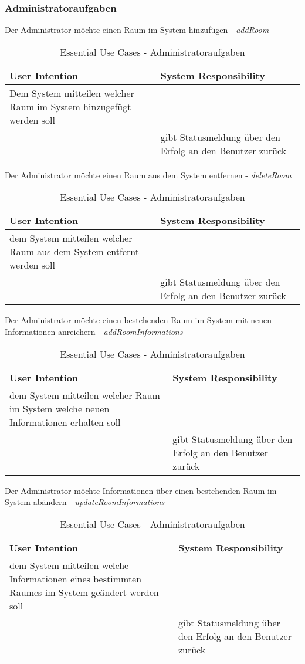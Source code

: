 \subsubsection{Administratoraufgaben}
\begin{table}[h]
	\caption{Essential Use Cases - Administratoraufgaben}
	Der Administrator möchte einen Raum im System hinzufügen - \textit{addRoom}\\
	\begin{tabularx}{\textwidth}{|X|X|}
	\rowcolor{heading} \textbf{User Intention} & \textbf{System Responsibility}\\ \hline
	Dem System mitteilen welcher Raum im System hinzugefügt werden soll & \\
	 & gibt Statusmeldung über den Erfolg an den Benutzer zurück \\ \hline
	\end{tabularx}
	
	
	Der Administrator möchte einen Raum aus dem System entfernen - \textit{deleteRoom}\\
	\begin{tabularx}{\textwidth}{|X|X|}
	\rowcolor{heading} \textbf{User Intention} & \textbf{System Responsibility}\\ \hline
	dem System mitteilen welcher Raum aus dem System entfernt werden soll & \\
	 & gibt Statusmeldung über den Erfolg an den Benutzer zurück \\ \hline
	\end{tabularx}
	
	
	Der Administrator möchte einen bestehenden Raum im System mit neuen Informationen anreichern - \textit{addRoomInformations}\\
	\begin{tabularx}{\textwidth}{|X|X|}
	\rowcolor{heading} \textbf{User Intention} & \textbf{System Responsibility}\\ \hline
	dem System mitteilen welcher Raum im System welche neuen Informationen erhalten soll & \\
	 & gibt Statusmeldung über den Erfolg an den Benutzer zurück \\ \hline
	\end{tabularx}


	Der Administrator möchte Informationen über einen bestehenden Raum im System abändern - \textit{updateRoomInformations}\\
	\begin{tabularx}{\textwidth}{|X|X|}
	\rowcolor{heading} \textbf{User Intention} & \textbf{System Responsibility}\\ \hline
	dem System mitteilen welche Informationen eines bestimmten Raumes im System geändert werden soll & \\
	 & gibt Statusmeldung über den Erfolg an den Benutzer zurück \\ \hline
	\end{tabularx}
	
\end{table}



